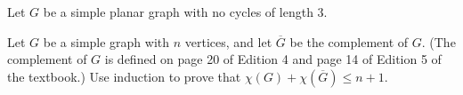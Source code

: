 \documentclass{exam}
\begin{document}
\begin{questions}
	\question[24] Let $G$ be a simple planar graph with no cycles of length 3.

	\question[20] Let $G$ be a simple graph with $n$ vertices, and let $\overline G$ be the complement of $G$. (The complement of $G$ is defined on page 20 of Edition 4 and page 14 of Edition 5 of the textbook.) Use induction to prove that $\chi(G)+\chi(\overline G) \leqslant n+1$.


\end{questions}
\end{document}
